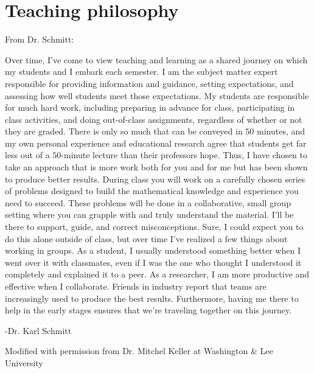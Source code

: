 \documentclass[10pt,]{book}
\theoremstyle{plain}
\theoremstyle{definition}
\theoremstyle{definition}
\theoremstyle{definition}
\theoremstyle{definition}
\theoremstyle{definition}
\numberwithin{equation}{section}
\begin{document}
\chapter*{Teaching philosophy}\label{preface-2}
From Dr. Schmitt:%
\par
Over time, I've come to view teaching and learning as a shared journey on which my students and I embark each semester. I am the subject matter expert responsible for providing information and guidance, setting expectations, and assessing how well students meet those expectations. My students are responsible for much hard work, including preparing in advance for class, participating in class activities, and doing out-of-class assignments, regardless of whether or not they are graded. There is only so much that can be conveyed in \(50\) minutes, and my own personal experience and educational research agree that students get far less out of a \(50\)-minute lecture than their professors hope. Thus, I have chosen to take an approach that is more work both for you and for me but has been shown to produce better results. During class you will work on a carefully chosen series of problems designed to build the mathematical knowledge and experience you need to succeed. These problems will be done in a collaborative, small group setting where you can grapple with and truly understand the material. I'll be there to support, guide, and correct misconceptions. Sure, I could expect you to do this alone outside of class, but over time I've realized a few things about working in groups. As a student, I usually understood something better when I went over it with classmates, even if I was the one who thought I understood it completely and explained it to a peer. As a researcher, I am more productive and effective when I collaborate. Friends in industry report that teams are increasingly used to produce the best results. Furthermore, having me there to help in the early stages ensures that we're traveling together on this journey.%
\par
-Dr. Karl Schmitt%
\par
Modified with permission from Dr. Mitchel Keller at Washington \& Lee University%
\setcounter{tocdepth}{1}
\renewcommand*\contentsname{Contents}
\tableofcontents
\mainmatter
\typeout{************************************************}
\typeout{************************************************}
\end{document}
